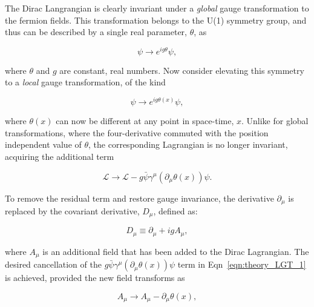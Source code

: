 The Dirac Langrangian is clearly invariant under a \textit{global} gauge transformation to the fermion fields. This transformation belongs to the U(1) symmetry group, and thus can be described by a single real parameter, $\theta$, as

\begin{equation}
    \psi \rightarrow e^{ig\theta}\psi,
\end{equation}

\noindent where $\theta$ and $g$ are constant, real numbers. Now consider elevating this symmetry to a \emph{local} gauge transformation, of the kind

\begin{equation}
    \psi \rightarrow e^{ig\theta(x)}\psi,
\end{equation}

\noindent where $\theta(x)$ can now be different at any point in space-time, $x$. Unlike for global transformations, where the four-derivative commuted with the position independent value of $\theta$, the corresponding Lagrangian is no longer invariant, acquiring the additional term

\begin{equation}
\label{eqn:theory_LGT_1}
    \mathcal{L} \rightarrow \mathcal{L} - g\bar{\psi}\gamma^{\mu}(\partial_{\mu}\theta(x))\psi.
\end{equation}


\noindent To remove the residual term and restore gauge invariance, the derivative $\partial_\mu$ is replaced by the covariant derivative, $D_{\mu}$, defined as:

\begin{equation}
    D_{\mu} \equiv \partial_{\mu} + igA_{\mu},
\end{equation}

\noindent where $A_\mu$ is an additional field that has been added to the Dirac Lagrangian. The desired cancellation of the $g\bar{\psi}\gamma^{\mu}(\partial_{\mu}\theta(x))\psi$ term in Eqn~\ref{eqn:theory_LGT_1} is achieved, provided the new field transforms as

\begin{equation}
    A_{\mu} \rightarrow A_{\mu} - \partial_{\mu}\theta(x),
\end{equation}

